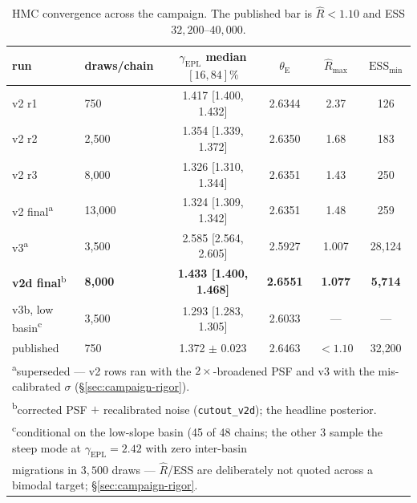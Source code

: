\documentclass[11pt,letterpaper]{article}
\newcommand{\thetaE}{\ensuremath{\theta_{\mathrm{E}}}}
\newcommand{\gammaEPL}{\ensuremath{\gamma_{\mathrm{EPL}}}}
\begin{document}
\begin{table}[ht]
\centering
\caption{HMC convergence across the campaign. The published bar is
$\hat R<1.10$ and ESS $32{,}200$--$40{,}000$.}
\label{tab:campaignhmc}
\begin{tabular}{llcccc}
\hline
run & draws/chain & $\gammaEPL$ median $[16,84]\%$ & $\thetaE$ & $\hat R_{\max}$ & $\mathrm{ESS}_{\min}$ \\
\hline
v2 r1 & 750 & 1.417 [1.400, 1.432] & 2.6344 & 2.37 & 126 \\
v2 r2 & 2{,}500 & 1.354 [1.339, 1.372] & 2.6350 & 1.68 & 183 \\
v2 r3 & 8{,}000 & 1.326 [1.310, 1.344] & 2.6351 & 1.43 & 250 \\
v2 final\textsuperscript{a} & 13{,}000 & 1.324 [1.309, 1.342] & 2.6351 & 1.48 & 259 \\
v3\textsuperscript{a} & 3{,}500 & 2.585 [2.564, 2.605] & 2.5927 & 1.007 & 28{,}124 \\
{\bf v2d final}\textsuperscript{b} & {\bf 8{,}000} & {\bf 1.433 [1.400, 1.468]} & {\bf 2.6551} & {\bf 1.077} & {\bf 5{,}714} \\
v3b, low basin\textsuperscript{c} & 3{,}500 & 1.293 [1.283, 1.305] & 2.6033 & --- & --- \\
\hline
published & 750 & 1.372 $\pm$ 0.023 & 2.6463 & $<1.10$ & 32{,}200 \\
\hline
\multicolumn{6}{l}{\footnotesize \textsuperscript{a}superseded ---
v2 rows ran with the $2\times$-broadened PSF and v3 with the
mis-calibrated $\sigma$ (\S\ref{sec:campaign-rigor}).}\\
\multicolumn{6}{l}{\footnotesize \textsuperscript{b}corrected PSF $+$
recalibrated noise (\texttt{cutout\_v2d}); the headline posterior.}\\
\multicolumn{6}{l}{\footnotesize \textsuperscript{c}conditional on the
low-slope basin (45 of 48 chains; the other 3 sample the steep mode at
$\gammaEPL=2.42$ with zero inter-basin}\\
\multicolumn{6}{l}{\footnotesize \phantom{\textsuperscript{c}}migrations
in $3{,}500$ draws --- $\hat R$/ESS are deliberately not quoted across a
bimodal target; \S\ref{sec:campaign-rigor}.}\\
\end{tabular}
\end{table}
\end{document}
